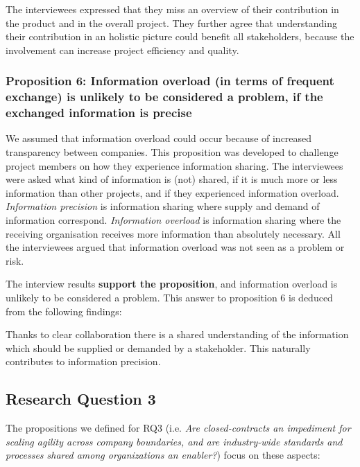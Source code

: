  The interviewees expressed that they miss an overview of their contribution in the product and in the overall project. They further agree that understanding their contribution in an holistic picture could benefit all stakeholders, because the involvement can increase project efficiency and quality.

\vspace{.2cm}
\subsubsection{Proposition 6: Information overload (in terms of frequent exchange) is unlikely to be considered a problem, if the exchanged information is precise}

We assumed that information overload could occur because of increased transparency between companies. This proposition was developed to challenge project members on how they experience information sharing. The interviewees were asked what kind of information is (not) shared, if it is much more or less information than other projects, and if they experienced information overload. {\em Information precision} is information sharing where supply and demand of information correspond. {\em Information overload} is information sharing where the receiving organisation receives more information than absolutely necessary. All the interviewees argued that information overload was not seen as a problem or risk.

The interview results {\bf support the proposition}, and information overload is unlikely to be considered a problem. This answer to proposition 6 is deduced from the following findings:

 Thanks to clear collaboration there is a shared understanding of the information which should be supplied or demanded by a stakeholder. This naturally contributes to information precision.

\subsection{Research Question 3}\label{sec:ResearchQuestion3}

The propositions we defined for  
RQ3 (i.e. {\em Are closed-contracts an impediment for scaling agility across company boundaries, and 
are industry-wide standards and processes shared among organizations an enabler?}) focus on these aspects:

